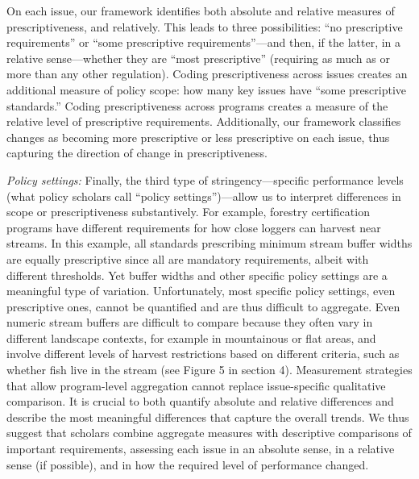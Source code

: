 \documentclass[
      12pt,
            Review ]{article}
\begin{document}
On each issue, our framework identifies both absolute and relative
measures of prescriptiveness, and relatively. This leads to three
possibilities: ``no prescriptive requirements'' or ``some prescriptive
requirements''---and then, if the latter, in a relative sense---whether
they are ``most prescriptive'' (requiring as much as or more than any
other regulation). Coding prescriptiveness across issues creates an
additional measure of policy scope: how many key issues have ``some
prescriptive standards.'' Coding prescriptiveness across programs
creates a measure of the relative level of prescriptive requirements.
Additionally, our framework classifies changes as becoming more
prescriptive or less prescriptive on each issue, thus capturing the
direction of change in prescriptiveness.



\emph{Policy settings:} Finally, the third type of stringency---specific
performance levels (what policy scholars call ``policy
settings'')---allow us to interpret differences in scope or
prescriptiveness substantively. For example, forestry certification
programs have different requirements for how close loggers can harvest
near streams. In this example, all standards prescribing minimum stream
buffer widths are equally prescriptive since all are mandatory
requirements, albeit with different thresholds. Yet buffer widths and
other specific policy settings are a meaningful type of variation.
Unfortunately, most specific policy settings, even prescriptive ones,
cannot be quantified and are thus difficult to aggregate. Even numeric
stream buffers are difficult to compare because they often vary in
different landscape contexts, for example in mountainous or flat areas,
and involve different levels of harvest restrictions based on different
criteria, such as whether fish live in the stream (see Figure 5 in
section 4). Measurement strategies that allow program-level aggregation
cannot replace issue-specific qualitative comparison. It is crucial to
both quantify absolute and relative differences and describe the most
meaningful differences that capture the overall trends. We thus suggest
that scholars combine aggregate measures with descriptive comparisons of
important requirements, assessing each issue in an absolute sense, in a
relative sense (if possible), and in how the required level of
performance changed.
\end{document}
